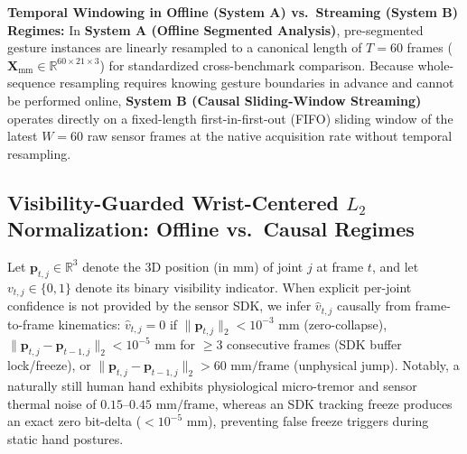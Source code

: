 \documentclass[10pt,twocolumn]{article}
\begin{document}
\textbf{Temporal Windowing in Offline (System A) vs.\ Streaming (System B) Regimes:} In \textbf{System A (Offline Segmented Analysis)}, pre-segmented gesture instances are linearly resampled to a canonical length of $T=60$ frames ($\mathbf{X}_{\text{mm}} \in \mathbb{R}^{60 \times 21 \times 3}$) for standardized cross-benchmark comparison. Because whole-sequence resampling requires knowing gesture boundaries in advance and cannot be performed online, \textbf{System B (Causal Sliding-Window Streaming)} operates directly on a fixed-length first-in-first-out (FIFO) sliding window of the latest $W=60$ raw sensor frames at the native acquisition rate without temporal resampling.

\subsection{Visibility-Guarded Wrist-Centered $L_2$ Normalization: Offline vs.\ Causal Regimes}
Let $\mathbf{p}_{t,j} \in \mathbb{R}^3$ denote the 3D position (in mm) of joint $j$ at frame $t$, and let $v_{t,j} \in \{0,1\}$ denote its binary visibility indicator. When explicit per-joint confidence is not provided by the sensor SDK, we infer $\hat{v}_{t,j}$ causally from frame-to-frame kinematics: $\hat{v}_{t,j} = 0$ if $\|\mathbf{p}_{t,j}\|_2 < 10^{-3}\text{ mm}$ (zero-collapse), $\|\mathbf{p}_{t,j} - \mathbf{p}_{t-1,j}\|_2 < 10^{-5}\text{ mm}$ for $\ge 3$ consecutive frames (SDK buffer lock/freeze), or $\|\mathbf{p}_{t,j} - \mathbf{p}_{t-1,j}\|_2 > 60\text{ mm/frame}$ (unphysical jump). Notably, a naturally still human hand exhibits physiological micro-tremor and sensor thermal noise of $0.15\text{--}0.45\text{ mm/frame}$, whereas an SDK tracking freeze produces an exact zero bit-delta ($<10^{-5}\text{ mm}$), preventing false freeze triggers during static hand postures.
\end{document}

